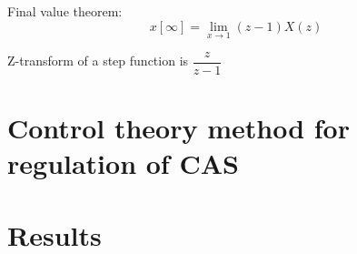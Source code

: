 \documentclass{article}
\begin{document}
Final value theorem:
\begin{equation}
    x[\infty] = \lim_{x\to 1} (z-1) X(z)
\end{equation}

Z-transform of a step function is $\dfrac{z}{z  -1}$
\section{Control theory method for regulation of CAS}


\section{Results}
\end{document}
